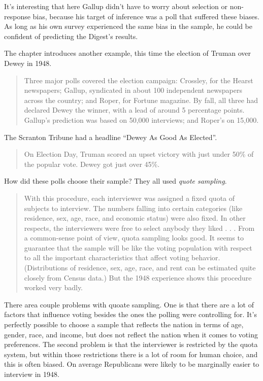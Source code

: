 \documentclass[
]{book}
\begin{document}
It's interesting that here Gallup didn't have to worry about selection or non-response bias, because his target of inference was a poll that suffered these biases. As long as his own survey experienced the same bias in the sample, he could be confident of predicting the Digest's results.

The chapter introduces another example, this time the election of Truman over Dewey in 1948.

\begin{quote}
Three major polls covered the election campaign: Crossley, for the Hearst newspapers; Gallup, syndicated in about 100 independent newspapers across the country; and Roper, for Fortune magazine. By fall, all three had declared Dewey the winner, with a lead of around 5 percentage points. Gallup's prediction was based on 50,000 interviews; and Roper's on 15,000.
\end{quote}

The Scranton Tribune had a headline ``Dewey As Good As Elected''.

\begin{quote}
On Election Day, Truman scored an upset victory with just under 50\% of the popular vote. Dewey got just over 45\%.
\end{quote}

How did these polls choose their sample? They all used \emph{quote sampling}.

\begin{quote}
With this procedure, each interviewer was assigned a fixed quota of subjects to interview. The numbers falling into certain categories (like residence, sex, age, race, and economic status) were also fixed. In other respects, the interviewers were free to select anybody they liked . . . From a common-sense point of view, quota sampling looks good. It seems to guarantee that the sample will be like the voting population with respect to all the important characteristics that affect voting behavior. (Distributions of residence, sex, age, race, and rent can be estimated quite closely from Census data.) But the 1948 experience shows this procedure worked very badly.
\end{quote}

There area couple problems with quoate sampling. One is that there are a lot of factors that influence voting besides the ones the polling were controlling for. It's perfectly possible to choose a sample that reflects the nation in terms of age, gender, race, and income, but does not reflect the nation when it comes to voting preferences. The second problem is that the interviewer is restricted by the quota system, but within those restrictions there is a lot of room for human choice, and this is often biased. On average Republicans were likely to be marginally easier to interview in 1948.
\end{document}
